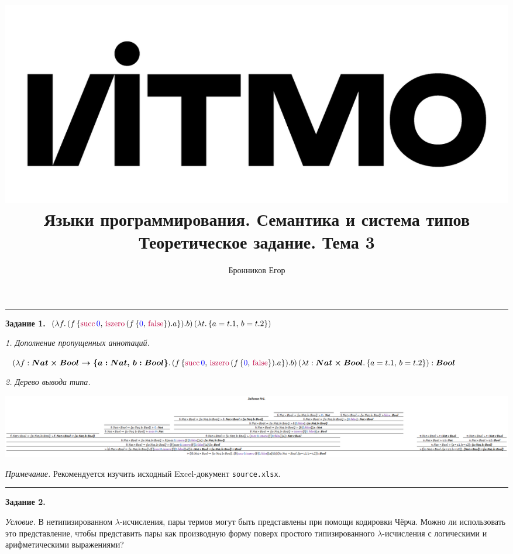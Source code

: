 \documentclass[landscape, 11pt]{report}
\title{
	\includegraphics[scale=0.07]{logo}\\
	\vspace{0.5em}
	Языки программирования. Семантика и система типов\\
	\vspace{0.2em}
	\Large Теоретическое задание. Тема 3
}
\author{Бронников Егор}
\date{}
\begin{document}
	
	
	\maketitle
	
	\vspace{-0.5cm}
	\hrule
	\vspace{0.5cm}
	
	
	\textbf{Задание 1.} $(\lambda f . \, (f \, \{ \text{\color{purple}succ} \, \text{\color{blue}0}, \, \text{\color{purple}iszero} \, (f \, \{\text{\color{blue}0}, \, \text{\color{purple}false}\}).a \}).b) \, (\lambda t . \, \{a = t.1, \, b = t.2\})$
	
	\vspace{0.2cm}
	
	\textit{1. Дополнение пропущенных аннотаций.}
	
	$(\lambda f : \boldsymbol{Nat \times Bool \rightarrow \{a: Nat, \, b: Bool\}}. \, (f \, \{ \text{\color{purple}succ} \, \text{\color{blue}0}, \, \text{\color{purple}iszero} \, (f \, \{\text{\color{blue}0}, \, \text{\color{purple}false}\}).a \}).b) \, (\lambda t : \boldsymbol{Nat \times Bool}. \, \{a = t.1, \, b = t.2\}) : \boldsymbol{Bool}$
	
	\vspace{0.2cm}
	
	\textit{2. Дерево вывода типа.}
	
	\includegraphics[scale=0.52]{task-1.png}

	\vspace{0.3cm}

	\small \textit{Примечание.} Рекомендуется изучить исходный Excel-документ \verb|source.xlsx|. \normalsize

	\vspace{0.2cm}
	\hrule
	\vspace{0.5cm}	
	
	
	\textbf{Задание 2.}

	\vspace{0.2cm}

	\textit{Условие.} В нетипизированном $\lambda$-исчисления, пары термов могут быть представлены при помощи кодировки Чёрча. Можно ли использовать это представление, чтобы представить пары как производную форму поверх простого типизированного $\lambda$-исчисления с логическими и арифметическими выражениями?
	
\end{document}
